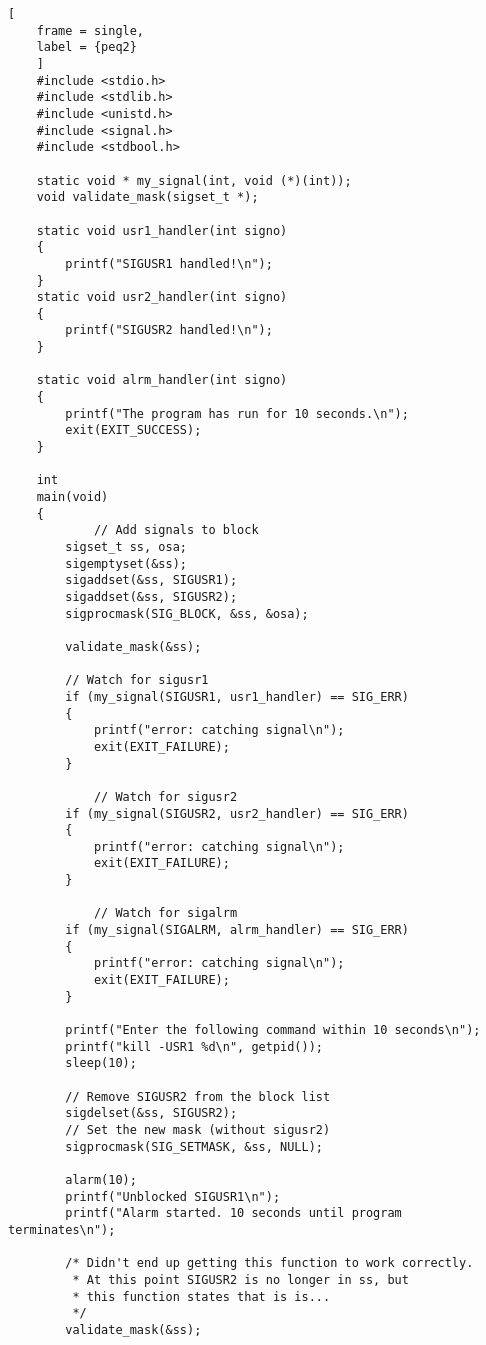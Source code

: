 \documentclass{article}
\begin{document}
\begin{lstlisting}[
    frame = single,
    label = {peq2}
    ]
    #include <stdio.h>
    #include <stdlib.h>
    #include <unistd.h>
    #include <signal.h>
    #include <stdbool.h>

    static void * my_signal(int, void (*)(int));
    void validate_mask(sigset_t *);

    static void usr1_handler(int signo)
    {
        printf("SIGUSR1 handled!\n");
    }
    static void usr2_handler(int signo)
    {
        printf("SIGUSR2 handled!\n");
    }

    static void alrm_handler(int signo)
    {
        printf("The program has run for 10 seconds.\n");
        exit(EXIT_SUCCESS);
    }

    int
    main(void)
    {
            // Add signals to block
        sigset_t ss, osa;
        sigemptyset(&ss);
        sigaddset(&ss, SIGUSR1);
        sigaddset(&ss, SIGUSR2);
        sigprocmask(SIG_BLOCK, &ss, &osa);

        validate_mask(&ss);

        // Watch for sigusr1
        if (my_signal(SIGUSR1, usr1_handler) == SIG_ERR)
        {
            printf("error: catching signal\n");
            exit(EXIT_FAILURE);
        }

            // Watch for sigusr2
        if (my_signal(SIGUSR2, usr2_handler) == SIG_ERR)
        {
            printf("error: catching signal\n");
            exit(EXIT_FAILURE);
        }

            // Watch for sigalrm
        if (my_signal(SIGALRM, alrm_handler) == SIG_ERR)
        {
            printf("error: catching signal\n");
            exit(EXIT_FAILURE);
        }

        printf("Enter the following command within 10 seconds\n");
        printf("kill -USR1 %d\n", getpid());
        sleep(10);

        // Remove SIGUSR2 from the block list
        sigdelset(&ss, SIGUSR2);
        // Set the new mask (without sigusr2)
        sigprocmask(SIG_SETMASK, &ss, NULL);

        alarm(10);
        printf("Unblocked SIGUSR1\n");
        printf("Alarm started. 10 seconds until program terminates\n");

        /* Didn't end up getting this function to work correctly.
         * At this point SIGUSR2 is no longer in ss, but
         * this function states that is is...
         */
        validate_mask(&ss);


\end{lstlisting}
\end{document}
